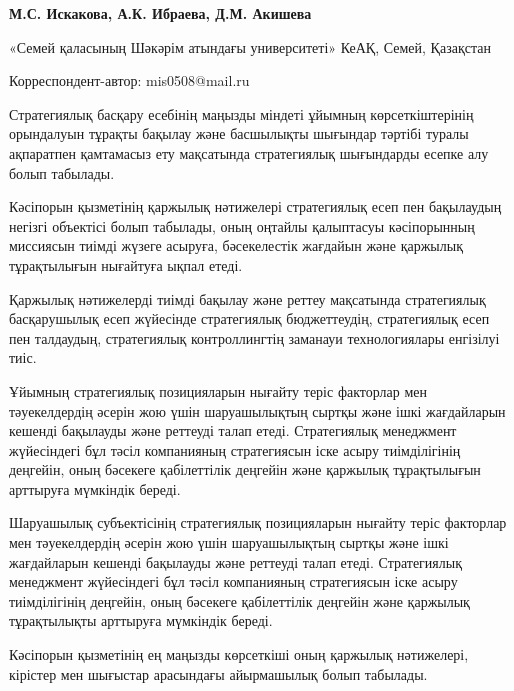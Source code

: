 
\begin{articleheader}

{\bfseries
М.С. Искакова\textsuperscript{\envelope },
А.К. Ибраева,
Д.М. Акишева
}
\end{articleheader}

\begin{affiliation}
«Семей қаласының Шәкәрім атындағы университеті» КеАҚ, Семей, Қазақстан

\raggedright \textsuperscript{\envelope }Корреспондент-автор: mis0508@mail.ru
\end{affiliation}

Стратегиялық басқару есебінің маңызды міндеті ұйымның көрсеткіштерінің
орындалуын тұрақты бақылау және басшылықты шығындар тәртібі туралы
ақпаратпен қамтамасыз ету мақсатында стратегиялық шығындарды есепке алу
болып табылады.

Кәсіпорын қызметінің қаржылық нәтижелері стратегиялық есеп пен
бақылаудың негізгі объектісі болып табылады, оның оңтайлы қалыптасуы
кәсіпорынның миссиясын тиімді жүзеге асыруға, бәсекелестік жағдайын және
қаржылық тұрақтылығын нығайтуға ықпал етеді.

Қаржылық нәтижелерді тиімді бақылау және реттеу мақсатында стратегиялық
басқарушылық есеп жүйесінде стратегиялық бюджеттеудің, стратегиялық есеп
пен талдаудың, стратегиялық контроллингтің заманауи технологиялары
енгізілуі тиіс.

Ұйымның стратегиялық позицияларын нығайту теріс факторлар мен
тәуекелдердің әсерін жою үшін шаруашылықтың сыртқы және ішкі жағдайларын
кешенді бақылауды және реттеуді талап етеді. Стратегиялық менеджмент
жүйесіндегі бұл тәсіл компанияның стратегиясын іске асыру тиімділігінің
деңгейін, оның бәсекеге қабілеттілік деңгейін және қаржылық тұрақтылығын
арттыруға мүмкіндік береді.

Шаруашылық субъектісінің стратегиялық позицияларын нығайту теріс
факторлар мен тәуекелдердің әсерін жою үшін шаруашылықтың сыртқы және
ішкі жағдайларын кешенді бақылауды және реттеуді талап етеді.
Стратегиялық менеджмент жүйесіндегі бұл тәсіл компанияның стратегиясын
іске асыру тиімділігінің деңгейін, оның бәсекеге қабілеттілік деңгейін
және қаржылық тұрақтылықты арттыруға мүмкіндік береді.

Кәсіпорын қызметінің ең маңызды көрсеткіші оның қаржылық нәтижелері,
кірістер мен шығыстар арасындағы айырмашылық болып табылады.

